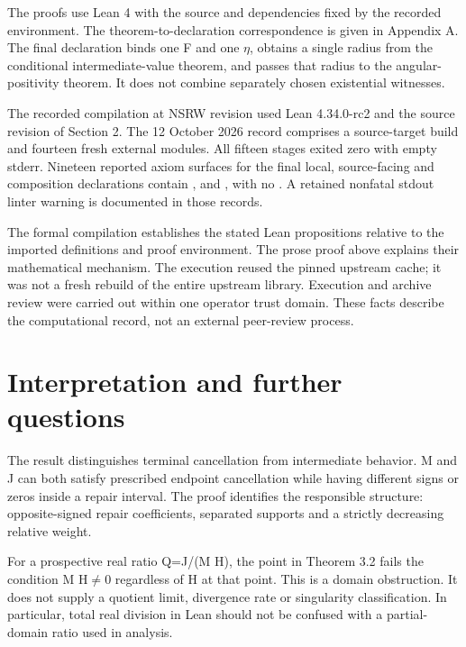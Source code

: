 \documentclass[11pt,a4paper]{article}
\begin{document}
The proofs use Lean 4 \cite{ref3} with the source and dependencies fixed by the recorded environment. The theorem-to-declaration correspondence is given in Appendix A. The final declaration binds one F and one \ensuremath{\eta}, obtains a single radius from the conditional intermediate-value theorem, and passes that radius to the angular-positivity theorem. It does not combine separately chosen existential witnesses.

The recorded compilation at NSRW revision  used Lean 4.34.0-rc2 and the source revision of Section 2. The 12 October 2026 record comprises a source-target build and fourteen fresh external modules. All fifteen stages exited zero with empty stderr. Nineteen reported axiom surfaces for the final local, source-facing and composition declarations contain ,  and , with no  \cite{ref4,ref5}. A retained nonfatal stdout linter warning is documented in those records.

The formal compilation establishes the stated Lean propositions relative to the imported definitions and proof environment. The prose proof above explains their mathematical mechanism. The execution reused the pinned upstream cache; it was not a fresh rebuild of the entire upstream library. Execution and archive review were carried out within one operator trust domain. These facts describe the computational record, not an external peer-review process.

\section{Interpretation and further questions}

The result distinguishes terminal cancellation from intermediate behavior. M and J can both satisfy prescribed endpoint cancellation while having different signs or zeros inside a repair interval. The proof identifies the responsible structure: opposite-signed repair coefficients, separated supports and a strictly decreasing relative weight.

For a prospective real ratio Q=J/(M H), the point in Theorem 3.2 fails the condition M H\ensuremath{\ne}0 regardless of H at that point. This is a domain obstruction. It does not supply a quotient limit, divergence rate or singularity classification. In particular, total real division in Lean should not be confused with a partial-domain ratio used in analysis.
\end{document}
